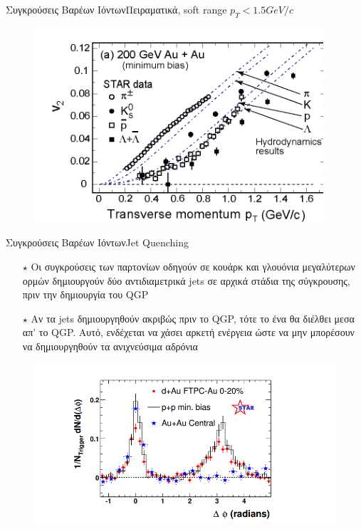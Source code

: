 \documentclass[18pt,notheorems,hyperref={pdfauthor=whatever}]{beamer}
\begin{document}
\begin{frame}{Συγκρούσεις Βαρέων Ιόντων}{Πειραματικά, soft range $p_T<1.5GeV/c$}
    \begin{figure}
        \centering
        \includegraphics[scale=1.2]{images/result_soft_1.png}
    \end{figure}
\end{frame}

\begin{frame}{Συγκρούσεις Βαρέων Ιόντων}{Jet Quenching}
    \begin{itemize}
        \item[$\star$] Oι συγκρούσεις των παρτονίων οδηγούν σε κουάρκ και γλουόνια μεγαλύτερων ορμών δημιουργούν δύο αντιδιαμετρικά jets σε αρχικά στάδια της σύγκρουσης, πριν την δημιουργία του QGP
        \item[$\star$] Αν τα jets δημιουργηθούν ακριβώς πριν  το QGP, τότε το ένα θα διέλθει μεσα απ' το QGP.
        Αυτό, ενδέχεται να χάσει αρκετή ενέργεια ώστε να μην μπορέσουν να δημιουργηθούν τα ανιχνεύσιμα αδρόνια \pause
    \end{itemize}
    \begin{figure}
        \centering
        \includegraphics[scale=0.7]{images/jet_quenching.png}
    \end{figure}
\end{frame}
\end{document}
